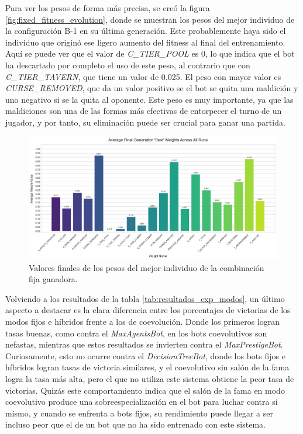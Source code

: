 Para ver los pesos de forma más precisa, se creó la figura \ref{fig:fixed_fitness_evolution}, donde se muestran los pesos del mejor individuo de la configuración B-1 en su última generación. Este probablemente haya sido el individuo que originó ese ligero aumento del fitness al final del entrenamiento. Aquí se puede ver que el valor de \textit{C\_TIER\_POOL} es 0, lo que indica que el bot ha descartado por completo el uso de este peso, al contrario que con \textit{C\_TIER\_TAVERN}, que tiene un valor de 0.025. El peso con mayor valor es \textit{CURSE\_REMOVED}, que da un valor positivo se el bot se quita una maldición y uno negativo si se la quita al oponente. Este peso es muy importante, ya que las maldiciones son una de las formas más efectivas de entorpecer el turno de un jugador, y por tanto, su eliminación puede ser crucial para ganar una partida.

\begin{figure}[H]
	\centering
	\includegraphics[width=1.0\textwidth]{img/fixed_avg_weights_best.png}
	\caption{Valores finales de los pesos del mejor individuo de la combinación fija ganadora.}
	\label{fig:fixed_avg_weights_best}
\end{figure}

Volviendo a los resultados de la tabla \ref{tab:resultados_exp_modos}, un último aspecto a destacar es la clara diferencia entre los porcentajes de victorias de los modos fijos e híbridos frente a los de coevolución. Donde los primeros logran tasas buenas, como contra el \textit{MaxAgentsBot}, en los bots coevolutivos son nefastas, mientras que estos resultados se invierten contra el \textit{MaxPrestigeBot}. Curiosamente, esto no ocurre contra el \textit{DecisionTreeBot}, donde los bots fijos e híbridos logran tasas de victoria similares, y el coevolutivo sin salón de la fama logra la tasa más alta, pero el que no utiliza este sistema obtiene la peor tasa de victorias. Quizás este comportamiento indica que el salón de la fama en modo coevolutivo produce una sobreespecialización en el bot para luchar contra si mismo, y cuando se enfrenta a bots fijos, su rendimiento puede llegar a ser incluso peor que el de un bot que no ha sido entrenado con este sistema.

